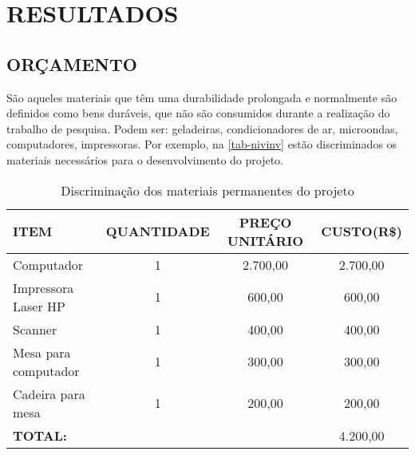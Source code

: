 \chapter{RESULTADOS}
\label{chap:resultados}


\section{ORÇAMENTO}
São aqueles materiais que têm uma durabilidade prolongada e normalmente são
definidos como bens duráveis, que não são consumidos durante a realização do trabalho de
pesquisa. Podem ser: geladeiras, condicionadores de ar, microondas, computadores,
impressoras. Por exemplo, na \autoref{tab-nivinv} estão discriminados os materiais necessários para o
desenvolvimento do projeto.

\begin{table}[htb]
\begin{center}
    
    \caption[ Discriminação dos materiais permanentes do projeto.
]{ Discriminação dos materiais permanentes do projeto}
    \label{tab-nivinv}
    \begin{tabular} {l|c|c|c}
        \hline
        \textbf{ITEM} & \textbf{QUANTIDADE}  & \textbf{PREÇO UNITÁRIO}  & \textbf{CUSTO(R\$)}  \\
        \hline
        Computador & 1  & 2.700,00 & 2.700,00 \\
        \hline
        Impressora Laser HP & 1  & 600,00 & 600,00 \\
        \hline
        Scanner & 1  & 400,00 & 400,00 \\
        \hline
        Mesa para computador & 1  & 300,00 & 300,00 \\
        \hline
        Cadeira para mesa& 1  & 200,00 & 200,00 \\
         \hline
         \multicolumn{2}{l}{\textbf{TOTAL:}}  & &4.200,00 \\
         \hline
    \end{tabular}
\end{center}
\end{table}


